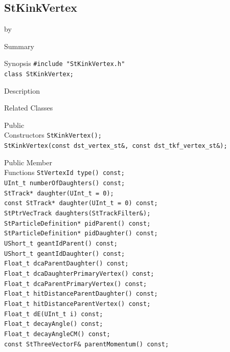 \documentclass[twoside]{article}
\newcommand{\entrylabel}[1]{\mbox{\textbf{{#1}}}\hfil}%
\newenvironment{entry}
{\begin{list}{}%
    {\renewcommand{\makelabel}{\entrylabel}%
     \setlength{\labelwidth}{90pt}%
     \setlength{\leftmargin}{\labelwidth}
     \advance\leftmargin by \labelsep%
      }%
    }%
  {\end{list}}
\newcommand{\Entrylabel}[1]%
{\raisebox{0pt}[1ex][0pt]{\makebox[\labelwidth][l]%
    {\parbox[t]{\labelwidth}{\hspace{0pt}\textbf{{#1}}}}}}
\newenvironment{Entry}%
{\renewcommand{\entrylabel}{\Entrylabel}\begin{entry}}%
  {\end{entry}}
\begin{document}
\subsection{StKinkVertex}
\label{sec:StKinkVertex}
\begin{Entry}
\item[Summary]
\item[Synopsis]
    \verb+#include "StKinkVertex.h"+\\
    \verb+class StKinkVertex;+\\
\item[Description]
\item[Related Classes]
\item[Public\\ Constructors]
    \verb+StKinkVertex();+\\
    \verb+StKinkVertex(const dst_vertex_st&, const dst_tkf_vertex_st&);+\\
\item[Public Member\\ Functions]
    \verb+StVertexId type() const;+\\
    \verb+UInt_t numberOfDaughters() const;+\\
    \verb+StTrack* daughter(UInt_t = 0);+\\
    \verb+const StTrack* daughter(UInt_t = 0) const;+\\
    \verb+StPtrVecTrack daughters(StTrackFilter&);+\\
    \verb+StParticleDefinition* pidParent() const;+\\
    \verb+StParticleDefinition* pidDaughter() const;+\\
    \verb+UShort_t geantIdParent() const;+\\
    \verb+UShort_t geantIdDaughter() const;+\\
    \verb+Float_t dcaParentDaughter() const;+\\
    \verb+Float_t dcaDaughterPrimaryVertex() const;+\\
    \verb+Float_t dcaParentPrimaryVertex() const;+\\
    \verb+Float_t hitDistanceParentDaughter() const;+\\
    \verb+Float_t hitDistanceParentVertex() const;+\\
    \verb+Float_t dE(UInt_t i) const;+\\
    \verb+Float_t decayAngle() const;+\\
    \verb+Float_t decayAngleCM() const;+\\
    \verb+const StThreeVectorF& parentMomentum() const;+\\

\end{Entry}
\end{document}
